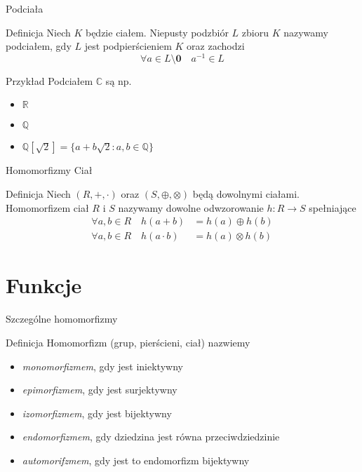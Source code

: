 \documentclass{beamer}
\begin{document}
\begin{frame}{Podciała}
    \begin{block}{Definicja}
        Niech $K$ będzie ciałem. Niepusty podzbiór $L$ zbioru $K$ nazywamy podciałem, gdy $L$ jest podpierścieniem $K$ oraz zachodzi
        $$\forall a \in L\setminus{\mathbf{0}} \quad a^{-1} \in L$$
    \end{block}
    \begin{exampleblock}{Przykład}
        Podciałem $\mathbb{C}$ są np.
        \begin{itemize}
            \item $\mathbb{R}$
            \item $\mathbb{Q}$
            \item $\mathbb{Q}[\sqrt{2}] = \{ a + b\sqrt{2} : a,b \in \mathbb{Q} \}$
        \end{itemize}
    \end{exampleblock}
\end{frame}

\begin{frame}{Homomorfizmy Ciał}
    \begin{block}{Definicja}
        Niech $(R, + , \cdot)$ oraz $(S, \oplus, \otimes)$ będą dowolnymi ciałami. Homomorfizem ciał $R$ i $S$ nazywamy dowolne odwzorowanie $h : R \rightarrow S$ spełniające 
        \begin{align*}
            \forall a,b \in R \quad h(a + b) & = h(a) \oplus h(b) \\
            \forall a,b \in R \quad h(a \cdot b) & = h(a) \otimes h(b) 
        \end{align*}
    \end{block}
\end{frame}
\section{Funkcje}

\begin{frame}{Szczególne homomorfizmy}
    \begin{block}{Definicja}
        Homomorfizm (grup, pierścieni, ciał) nazwiemy 
        \begin{itemize}
            \item \textit{monomorfizmem}, gdy jest iniektywny
            \item \textit{epimorfizmem}, gdy jest surjektywny
            \item \textit{izomorfizmem}, gdy jest bijektywny
            \item \textit{endomorfizmem}, gdy dziedzina jest równa przeciwdziedzinie
            \item \textit{automorifzmem}, gdy jest to endomorfizm bijektywny 
        \end{itemize}
    \end{block}
\end{frame}
\end{document}
